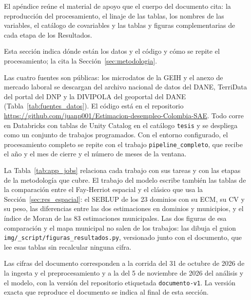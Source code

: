 
\label{sec:apendice}

El apéndice reúne el material de apoyo que el cuerpo del documento cita: la reproducción del procesamiento, el linaje de las tablas, los nombres de las variables, el catálogo de covariables y las tablas y figuras complementarias de cada etapa de los Resultados.

\label{app:reproducibilidad}

Esta sección indica dónde están los datos y el código y cómo se repite el procesamiento; la cita la Sección~\ref{sec:metodologia}.

Las cuatro fuentes son públicas: los microdatos de la GEIH y el anexo de mercado laboral se descargan del archivo nacional de datos del DANE, TerriData del portal del DNP y la DIVIPOLA del geoportal del DANE (Tabla~\ref{tab:fuentes_datos}). El código está en el repositorio \url{https://github.com/juanp001/Estimacion-desempleo-Colombia-SAE}. Todo corre en Databricks con tablas de Unity Catalog en el catálogo \texttt{tesis} y se despliega como un conjunto de trabajos programados. Con el entorno configurado, el procesamiento completo se repite con el trabajo \texttt{pipeline\_completo}, que recibe el año y el mes de cierre y el número de meses de la ventana.

La Tabla~\ref{tab:app_jobs} relaciona cada trabajo con sus tareas y con las etapas de la metodología que cubre. El trabajo del modelo escribe también las tablas de la comparación entre el Fay-Herriot espacial y el clásico que usa la Sección~\ref{sec:res_espacial}: el SEBLUP de los 23 dominios con su ECM, su CV y su peso, las diferencias entre las dos estimaciones en dominios y municipios, y el índice de Moran de las 83 estimaciones municipales. Las dos figuras de esa comparación y el mapa municipal no salen de los trabajos: las dibuja el guion \texttt{img/\_script/figuras\_resultados.py}, versionado junto con el documento, que lee esas tablas sin recalcular ninguna cifra.

Las cifras del documento corresponden a la corrida del 31 de octubre de 2026 de la ingesta y el preprocesamiento y a la del 5 de noviembre de 2026 del análisis y el modelo, con la versión del repositorio etiquetada \texttt{documento-v1}. La versión exacta que reproduce el documento se indica al final de esta sección.

